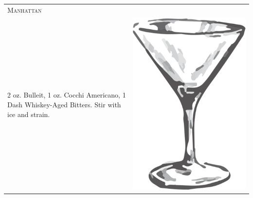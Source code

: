 \documentclass{article}
\begin{document}
\begin{tabular}{p{2in} p{0.5in}}
  \multicolumn{2}{p{3in}}{\centering\Huge\textsc{Manhattan}} \\ 
  
   \vspace{-0.1in}2 oz. Bulleit, 1 oz. Cocchi Americano, 1 Dash Whiskey-Aged
    Bitters. Stir with ice and strain. &
   \vspace{-0.1in} \includegraphics{goblet.png}
\end{tabular}
\end{document}
